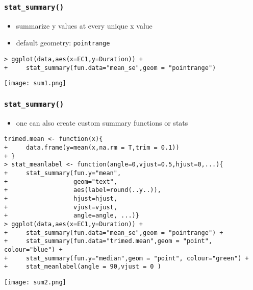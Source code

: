 \begin{frame}\frametitle{\texttt{stat\_summary()}}
  \begin{itemize}
  \item summarize y values at every unique x value
  \item default geometry: \texttt{pointrange}
  \end{itemize}
\small
\begin{verbatim}
> ggplot(data,aes(x=EC1,y=Duration)) +
+     stat_summary(fun.data="mean_se",geom = "pointrange")
\end{verbatim}
\begin{center}
  \texttt{[image: sum1.png]}
\end{center}
\end{frame}


\begin{frame}\frametitle{\texttt{stat\_summary()}}
  \begin{itemize}
  \item one can also create custom summary functions or stats
  \end{itemize}
\footnotesize
\begin{verbatim}
trimed.mean <- function(x){
+     data.frame(y=mean(x,na.rm = T,trim = 0.1))
+ }
> stat_meanlabel <- function(angle=0,vjust=0.5,hjust=0,...){
+     stat_summary(fun.y="mean",
+                  geom="text",
+                  aes(label=round(..y..)),
+                  hjust=hjust,
+                  vjust=vjust,
+                  angle=angle, ...)}
> ggplot(data,aes(x=EC1,y=Duration)) +
+     stat_summary(fun.data="mean_se",geom = "pointrange") +
+     stat_summary(fun.data="trimed.mean",geom = "point", colour="blue") +
+     stat_summary(fun.y="median",geom = "point", colour="green") +
+     stat_meanlabel(angle = 90,vjust = 0 )
\end{verbatim}
\begin{center}
  \texttt{[image: sum2.png]}
\end{center}
\end{frame}

